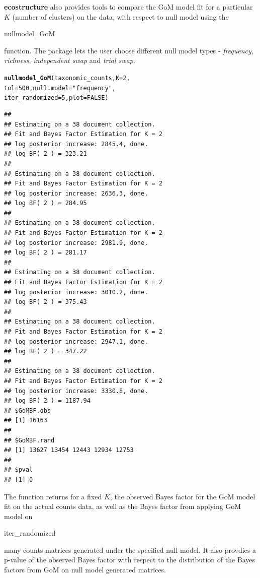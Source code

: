 \documentclass[12pt]{article}\usepackage[]{graphicx}\usepackage[usenames,dvipsnames]{color}
\makeatletter
\newcommand{\hlnum}[1]{\textcolor[rgb]{0.686,0.059,0.569}{#1}}%
\newcommand{\hlstr}[1]{\textcolor[rgb]{0.192,0.494,0.8}{#1}}%
\newcommand{\hlstd}[1]{\textcolor[rgb]{0.345,0.345,0.345}{#1}}%
\newcommand{\hlkwc}[1]{\textcolor[rgb]{0.333,0.667,0.333}{#1}}%
\newcommand{\hlkwd}[1]{\textcolor[rgb]{0.737,0.353,0.396}{\textbf{#1}}}%
\newenvironment{kframe}{%
 \def\at@end@of@kframe{}%
 \ifinner\ifhmode%
  \def\at@end@of@kframe{\end{minipage}}%
  \begin{minipage}{\columnwidth}%
 \fi\fi%
 \def\FrameCommand##1{\hskip\@totalleftmargin \hskip-\fboxsep
 \colorbox{shadecolor}{##1}\hskip-\fboxsep
     \hskip-\linewidth \hskip-\@totalleftmargin \hskip\columnwidth}%
 \MakeFramed {\advance\hsize-\width
   \@totalleftmargin\z@ \linewidth\hsize
   \@setminipage}}%
 {\par\unskip\endMakeFramed%
 \at@end@of@kframe}
\newenvironment{knitrout}{}{} %
\makeatother
\begin{document}
\newpage

\textbf{ecostructure} also provides tools to compare the GoM model fit for a particular $K$ (number of clusters) on the data, with respect to null model using the \begin{verb} nullmodel_GoM \end{verb} function. The package lets the user choose different null model types - \textit{frequency}, \textit{richness}, \textit{independent swap} and \textit{trial swap}.

\begin{knitrout}
\color{fgcolor}\begin{kframe}
\begin{alltt}
\hlkwd{nullmodel_GoM}\hlstd{(taxonomic_counts,} \hlkwc{K}\hlstd{=}\hlnum{2}\hlstd{,}
               \hlkwc{tol}\hlstd{=}\hlnum{500}\hlstd{,} \hlkwc{null.model}\hlstd{=}\hlstr{"frequency"}\hlstd{,}
               \hlkwc{iter_randomized}\hlstd{=}\hlnum{5}\hlstd{,} \hlkwc{plot}\hlstd{=}\hlnum{FALSE}\hlstd{)}
\end{alltt}
\begin{verbatim}
## 
## Estimating on a 38 document collection.
## Fit and Bayes Factor Estimation for K = 2
## log posterior increase: 2845.4, done.
## log BF( 2 ) = 323.21
## 
## Estimating on a 38 document collection.
## Fit and Bayes Factor Estimation for K = 2
## log posterior increase: 2636.3, done.
## log BF( 2 ) = 284.95
## 
## Estimating on a 38 document collection.
## Fit and Bayes Factor Estimation for K = 2
## log posterior increase: 2981.9, done.
## log BF( 2 ) = 281.17
## 
## Estimating on a 38 document collection.
## Fit and Bayes Factor Estimation for K = 2
## log posterior increase: 3010.2, done.
## log BF( 2 ) = 375.43
## 
## Estimating on a 38 document collection.
## Fit and Bayes Factor Estimation for K = 2
## log posterior increase: 2947.1, done.
## log BF( 2 ) = 347.22
## 
## Estimating on a 38 document collection.
## Fit and Bayes Factor Estimation for K = 2
## log posterior increase: 3330.8, done.
## log BF( 2 ) = 1187.94
## $GoMBF.obs
## [1] 16163
## 
## $GoMBF.rand
## [1] 13627 13454 12443 12934 12753
## 
## $pval
## [1] 0
\end{verbatim}
\end{kframe}
\end{knitrout}

The function returns for a fixed $K$, the observed Bayes factor for the GoM model fit on the actual counts data, as well as the Bayes factor from applying GoM model on \begin{verb} iter_randomized \end{verb} many counts matrices generated under the specified null model. It also provdies a p-value of the observed Bayes factor with respect to the distribution of the Bayes factors from GoM on null model generated matrices.
\end{document}
